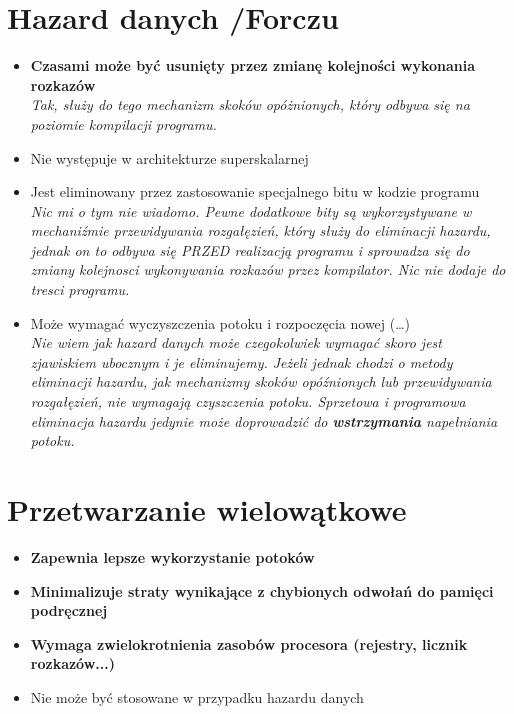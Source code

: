\documentclass[a4paper,twoside]{article}
\begin{document}
\section{Hazard danych {\small /Forczu}}
	\begin{itemize}
    \item \textbf{Czasami może być usunięty przez zmianę kolejności wykonania rozkazów}\\
    {\small \emph{Tak, służy do tego mechanizm skoków opóżnionych, który odbywa się na poziomie kompilacji programu.}}
    \item Nie występuje w architekturze superskalarnej
    \item Jest eliminowany przez zastosowanie specjalnego bitu w kodzie programu\\
    {\small \emph{Nic mi o tym nie wiadomo. Pewne dodatkowe bity są wykorzystywane w mechaniźmie przewidywania rozgałęzień, który służy do eliminacji hazardu, jednak on to odbywa się PRZED realizacją programu i sprowadza się do zmiany kolejnosci wykonywania rozkazów przez kompilator. Nic nie dodaje do tresci programu.}}
    \item Może wymagać wyczyszczenia potoku i rozpoczęcia nowej (…)\\
    {\small \emph{Nie wiem jak hazard danych może czegokolwiek wymagać skoro jest zjawiskiem ubocznym i je eliminujemy. Jeżeli jednak chodzi o metody eliminacji hazardu, jak mechanizmy skoków opóźnionych lub przewidywania rozgałęzień, nie wymagają czyszczenia potoku. Sprzetowa i programowa eliminacja hazardu jedynie może doprowadzić do \textbf{wstrzymania} napełniania potoku.}}
    \end{itemize}

\section{Przetwarzanie wielowątkowe}
	\begin{itemize}
    \item \textbf{Zapewnia lepsze wykorzystanie potoków}
    \item \textbf{Minimalizuje straty wynikające z chybionych odwołań do pamięci podręcznej}
    \item \textbf{Wymaga zwielokrotnienia zasobów procesora (rejestry, licznik rozkazów...)}
    \item Nie może być stosowane w przypadku hazardu danych
    \end{itemize}
\end{document}
